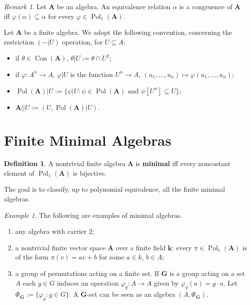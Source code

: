 \documentclass{amsart}
\theoremstyle{plain}
\theoremstyle{definition}
\newtheorem{definition}[theorem]{Definition}
\theoremstyle{remark}
\newtheorem{remark}[theorem]{Remark}
\newtheorem{example}[theorem]{Example}
\def\phi{\varphi}
\DeclareMathOperator{\Con}{Con}
\DeclareMathOperator{\Pol}{Pol}
\begin{document}
\begin{remark}
    Let $\mathbf{A}$ be an algebra. 
    An equivalence relation $\alpha$ is a congruence of $\mathbf{A}$ iff $\phi(\alpha) \subseteq \alpha$ for every $\phi \in \Pol_1(\mathbf{A})$. 
\end{remark}

Let $\mathbf{A}$ be a finite algebra. 
We adopt the following convention, concerning the restriction $(-|U)$ operation, for $U \subseteq A$: 
\begin{itemize}
    \item if $\theta \in \Con(\mathbf{A})$, $\theta | U := \theta \cap U^2$; 
    \item if $\phi: A^n \to A$, $\phi|U$ is the function $U^n \to A$, $(u_1, \ldots, u_n) \mapsto \phi(u_1, \ldots, u_n)$; 
    \item $\Pol(\mathbf{A})|U:=\{\psi|U : \psi \in \Pol(\mathbf{A}) \text{ and } \psi[U^n] \subseteq U \}$; 
    \item $\mathbf{A}||U := (U, \Pol(\mathbf{A})|U)$. 
\end{itemize}

\section{Finite Minimal Algebras}
\begin{definition}
    A nontrivial finite algebra $\mathbf{A}$ is \textbf{minimal} iff every noncostant element of $\Pol_1(\mathbf{A})$ is bijective.
\end{definition}

The goal is to classify, up to polynomial equivalence, all the finite minimal algebras. 

\begin{example}
    The following are examples of minimal algebras. 
    \begin{enumerate}
        \item any algebra with carrier $2$; 
        \item a nontrivial finite vector space $\mathbf{A}$ over a finite field $\mathbf{k}$: every $\pi \in \Pol_1(\mathbf{A})$ is of the form $\pi(v)=av+b$ for some $a \in k$, $b \in A$; 
        \item a group of permutations acting on a finite set. If $\mathbf{G}$ is a group acting on a set $A$ 
        each $g \in G$ induces an operation $\phi_g: A \to A$ given by $\phi_g(a)=g \cdot a$. 
        Let $\Phi_\mathbf{G}:=\{\phi_g: g \in G\}$. 
        A $\mathbf{G}$-set can be seen as an algebra $(A, \Phi_\mathbf{G})$.
    \end{enumerate}
\end{example}
\end{document}
